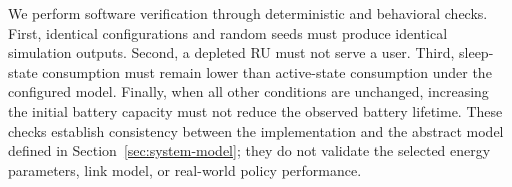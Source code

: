 We perform software verification through deterministic and behavioral checks. First, identical configurations and random seeds must produce identical simulation outputs. Second, a depleted RU must not serve a user. Third, sleep-state consumption must remain lower than active-state consumption under the configured model. Finally, when all other conditions are unchanged, increasing the initial battery capacity must not reduce the observed battery lifetime. These checks establish consistency between the implementation and the abstract model defined in Section~\ref{sec:system-model}; they do not validate the selected energy parameters, link model, or real-world policy performance.
